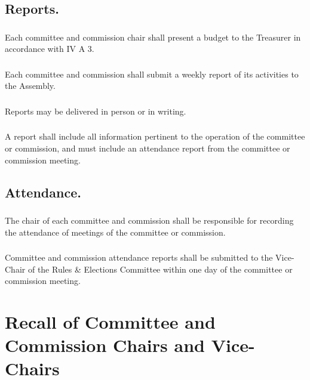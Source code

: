 \subsection{Reports.}

\subsubsection{}
Each committee and commission chair shall present a budget to the Treasurer in accordance with IV A 3.

\subsubsection{}
Each committee and commission shall submit a weekly report of its activities to the Assembly. 

\subsubsection{}
Reports may be delivered in person or in writing.
 
\subsubsection{}
A report shall include all information pertinent to the operation of the
committee or commission, and must include an attendance report from the
committee or commission meeting.

\subsection{Attendance.}

\subsubsection{}
The chair of each committee and commission shall be responsible for recording the attendance of meetings of the committee or commission. 

\subsubsection{}
Committee and commission attendance reports shall be submitted to the Vice-Chair of the Rules \& Elections Committee within one day of the committee or commission meeting.


\section{Recall of Committee and Commission Chairs and Vice-Chairs}

